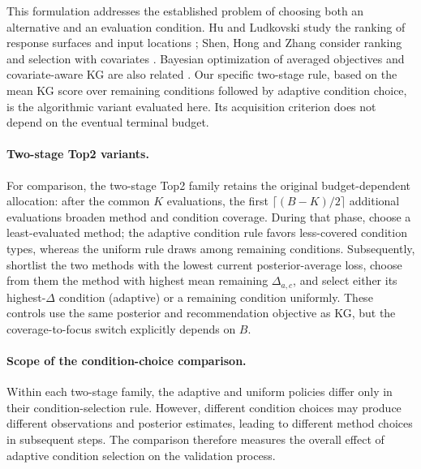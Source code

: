 \documentclass[10pt,a4paper]{article}
\begin{document}
This formulation addresses the established problem of choosing both an alternative and an evaluation condition. Hu and Ludkovski study the ranking of response surfaces and input locations \cite{hu2017}; Shen, Hong and Zhang consider ranking and selection with covariates \cite{shen2017}. Bayesian optimization of averaged objectives and covariate-aware KG are also related \cite{toscano2022,ding2022}. Our specific two-stage rule, based on the mean KG score over remaining conditions followed by adaptive condition choice, is the algorithmic variant evaluated here. Its acquisition criterion does not depend on the eventual terminal budget.

\paragraph{Two-stage Top2 variants.}
For comparison, the two-stage Top2 family retains the original budget-dependent allocation: after the common $K$ evaluations, the first $\lceil(B-K)/2\rceil$ additional evaluations broaden method and condition coverage. During that phase, choose a least-evaluated method; the adaptive condition rule favors less-covered condition types, whereas the uniform rule draws among remaining conditions. Subsequently, shortlist the two methods with the lowest current posterior-average loss, choose from them the method with highest mean remaining $\Delta_{a,c}$, and select either its highest-$\Delta$ condition (adaptive) or a remaining condition uniformly. These controls use the same posterior and recommendation objective as KG, but the coverage-to-focus switch explicitly depends on $B$.

\paragraph{Scope of the condition-choice comparison.}
Within each two-stage family, the adaptive and uniform
policies differ only in their condition-selection rule.
However, different condition choices may produce different
observations and posterior estimates, leading to different
method choices in subsequent steps. The comparison therefore
measures the overall effect of adaptive condition selection
on the validation process.
\end{document}

